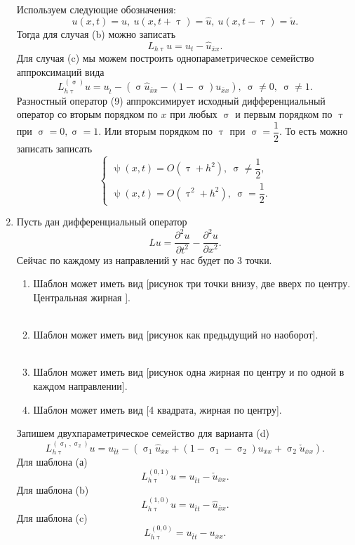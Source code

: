 \documentclass[a4paper, 12pt]{report}
\numberwithin{equation}{section}
\newcommand{\ol}{\overline}
\renewcommand{\tau}{\uptau}
\renewcommand{\sigma}{\upsigma}
\renewcommand{\psi}{\uppsi}
\renewcommand{\d}{\partial}
\begin{document}
\begin{enumerate}
\begin{equation}
		\end{equation}
		Используем следующие обозначения: $$u(x,t) = u,\ u(x, t+\tau) = \hat u, \ u(x, t-\tau) = \check {u}.$$
		Тогда для случая (b) можно записать \begin{equation}
			L_{h\tau} u = u_t - \hat u_{\ol x x}.
		\end{equation}
		Для случая (c) мы можем построить однопараметрическое семейство аппроксимаций вида
		\begin{equation}
			L_{h\tau}^{(\sigma)}u = u_{\hat t} - (\sigma \hat u_{\ol x x} - (1-\sigma) u_{\ol x x}),\ \sigma \ne 0,\ \sigma \ne 1.
		\end{equation}
		Разностный оператор (9) аппроксимирует исходный дифференциальный оператор со вторым порядком по $x$ при любых $\sigma$ и первым порядком по $\tau$ при $\sigma =0, \sigma = 1$. Или вторым порядком по $\tau$ при $\sigma = \dfrac 12$. То есть можно записать записать 
		\begin{equation}
			\begin{cases}
				\psi(x,t) = O(\tau + h^2),\ \sigma \ne \dfrac 12,\\
				\psi(x,t) = O(\tau^2 + h^2),\ \sigma = \dfrac 12.
			\end{cases}
		\end{equation}
		\item Пусть дан дифференциальный оператор $$Lu = \dfrac{\d ^2u}{\d t^2} - \dfrac{\d ^2 u}{\d x^2}.$$
		Сейчас по каждому из направлений у нас будет по 3 точки.
		\begin{enumerate}
			\item Шаблон может иметь вид [рисунок три точки внизу, две вверх по центру. Центральная жирная ].\\\\
			\item Шаблон может иметь вид [рисунок как предыдущий но наоборот].\\\\
			\item Шаблон может иметь вид [рисунок одна жирная по центру и по одной в каждом направлении].
			\item Шаблон может иметь вид [4 квадрата, жирная по центру].
		\end{enumerate}
		Запишем двухпараметрическое семейство для варианта (d)
		\begin{equation}
			L_{h\tau}^{(\sigma_1, \sigma_2)}u = u_{\ol t t} - (\sigma_1 \hat u_{\ol x x} + (1-\sigma_1 - \sigma _2) u_{\ol x x} + \sigma_2 \check u_{\ol x x}).
		\end{equation}
		Для шаблона (а) \begin{equation}
			L_{h\tau}^{(0,1)} u= u_{\ol t t} - \check u_{\ol x x}.
		\end{equation}
		Для шаблона (b) \begin{equation}
			L_{h\tau}^{(1,0)} u= u_{\ol t t} - \hat u_{\ol x x}.
		\end{equation}
		Для шаблона (c) \begin{equation}
			L_{h\tau}^{(0,0)} = u_{\ol t t} - u_{\ol x x}.
		\end{equation}
			\end{enumerate}
\end{document}
